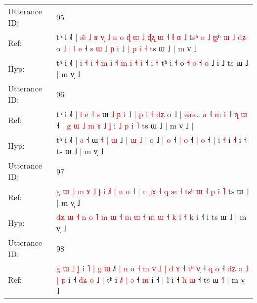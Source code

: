 \documentclass[10pt]{article}
\DeclareRobustCommand{\hl}[1]{{\textcolor{red}{#1}}}
\begin{document}
\begin{longtable}{ll}
 \\
\midrule
Utterance ID: & 95 \\
Ref: & tʰ i ˩˥ |\hl{ }\hl{æ}\hl{̃} \hl{˩} \hl{ʁ} \hl{v}\hl{̩} \hl{˩} \hl{n} \hl{o} \hl{ɖ} \hl{ɯ} \hl{˩} \hl{ɖ}\hl{ʐ} \hl{ɯ} ˧\hl{ }\hl{ɬ} \hl{ɑ} \hl{˩} t\hl{s}\hl{ʰ}\hl{ }\hl{o}\hl{ }\hl{˩}\hl{ }\hl{ʈ}\hl{ʂ}ʰ\hl{ }\hl{ɯ} \hl{˩} \hl{d}\hl{ʑ} o\hl{ }\hl{˩}\hl{ }\hl{|} \hl{l} \hl{e} ˧\hl{ }\hl{s} \hl{ɯ} ˩\hl{ }\hl{ɲ} i ˩\hl{ }\hl{|}\hl{ }\hl{p}\hl{ }\hl{i}\hl{ }\hl{˧} ts ɯ ˩ | m v̩ ˩
 \\
Hyp: & tʰ i ˩˥ |\hl{}\hl{}\hl{} \hl{i} \hl{˧} \hl{}\hl{i} \hl{˧} \hl{m} \hl{i} \hl{˧} \hl{m} \hl{i} \hl{}\hl{˧} \hl{i} ˧\hl{}\hl{} \hl{i} \hl{˧} t\hl{}\hl{}\hl{}\hl{}\hl{}\hl{}\hl{}\hl{}\hl{}ʰ\hl{}\hl{} \hl{i} \hl{}\hl{˧} o\hl{}\hl{}\hl{}\hl{} \hl{˧} \hl{o} ˧\hl{}\hl{} \hl{o} ˩\hl{}\hl{} i ˩\hl{}\hl{}\hl{}\hl{}\hl{}\hl{}\hl{}\hl{} ts ɯ ˩ | m v̩ ˩
 \\
\midrule
Utterance ID: & 96 \\
Ref: & tʰ i ˩˥ |\hl{ }\hl{l} \hl{e} ˧\hl{ }\hl{s} ɯ \hl{˩} \hl{ɲ} \hl{i} ˩ |\hl{ }\hl{p} \hl{i} \hl{˧} \hl{d}\hl{ʑ} o ˩ |\hl{ }\hl{ə}\hl{ə}\hl{ə}\hl{…} \hl{ə} ˧ \hl{m} \hl{i} ˧ \hl{ɳ} \hl{ɯ} ˧ |\hl{ }\hl{g}\hl{ }\hl{ɯ}\hl{ }\hl{˩}\hl{ }\hl{m}\hl{ }\hl{ɤ} \hl{˩} \hl{ʝ} i\hl{ }\hl{˩} \hl{p} i \hl{˥} ts ɯ ˩ | m v̩ ˩\hl{ }\hl{|}
 \\
Hyp: & tʰ i ˩˥ |\hl{}\hl{} \hl{ə} ˧\hl{}\hl{} ɯ \hl{˧} \hl{|} \hl{ɯ} ˩ |\hl{}\hl{} \hl{ɯ} \hl{˩} \hl{}\hl{|} o ˩ |\hl{}\hl{}\hl{}\hl{}\hl{} \hl{o} ˧ \hl{|} \hl{o} ˧ \hl{|} \hl{o} ˧ |\hl{}\hl{}\hl{}\hl{}\hl{}\hl{}\hl{}\hl{}\hl{}\hl{} \hl{i} \hl{˧} i\hl{}\hl{} \hl{˧} i \hl{˧} ts ɯ ˩ | m v̩ ˩\hl{}\hl{}
 \\
\midrule
Utterance ID: & 97 \\
Ref: & \hl{g}\hl{ }\hl{ɯ} \hl{˩} \hl{m} \hl{ɤ} \hl{˩} \hl{ʝ} \hl{i} \hl{˩}\hl{˥} \hl{|} \hl{n} \hl{o} ˧\hl{ }\hl{|} \hl{n} \hl{j}\hl{ɤ} ˧ \hl{q} \hl{æ} ˧ \hl{t}\hl{s}\hl{ʰ} \hl{ɯ} ˧\hl{ }\hl{p} i\hl{ }\hl{˥} ts ɯ ˩ | m v̩ ˩
 \\
Hyp: & \hl{}\hl{d}\hl{ʑ} \hl{ɯ} \hl{˧} \hl{n} \hl{o} \hl{˥} \hl{m} \hl{}\hl{ɯ} \hl{˧} \hl{m} \hl{ɯ} ˧\hl{}\hl{} \hl{m} \hl{}\hl{ɯ} ˧ \hl{k} \hl{i} ˧ \hl{}\hl{}\hl{k} \hl{i} ˧\hl{}\hl{} i\hl{}\hl{} ts ɯ ˩ | m v̩ ˩
 \\
\midrule
Utterance ID: & 98 \\
Ref: & \hl{g} \hl{ɯ} \hl{˩} \hl{ʝ} i \hl{˥} \hl{|}\hl{ }\hl{g} \hl{ɯ} ˩\hl{˥} \hl{|}\hl{ }\hl{n} o \hl{˧} \hl{m} \hl{v}\hl{̩} \hl{˩} \hl{|}\hl{ }\hl{d} \hl{ɤ} ˧ \hl{t}\hl{ʰ} \hl{v}\hl{̩} ˧ \hl{}\hl{q} \hl{o} ˧ \hl{d}\hl{ʑ} \hl{o} \hl{˩} \hl{|}\hl{ }\hl{p} i ˧ \hl{d}\hl{ʑ}\hl{ }\hl{o} \hl{˩} \hl{|} tʰ i \hl{˩}\hl{˥}\hl{ }\hl{|} \hl{ə} ˧ \hl{}\hl{m} i ˧ \hl{|}\hl{ }\hl{l} i ˧ \hl{h} \hl{ɯ} ˧ ts ɯ \hl{˧}\hl{˥} | m v̩ ˩

\end{longtable}
\end{document}

